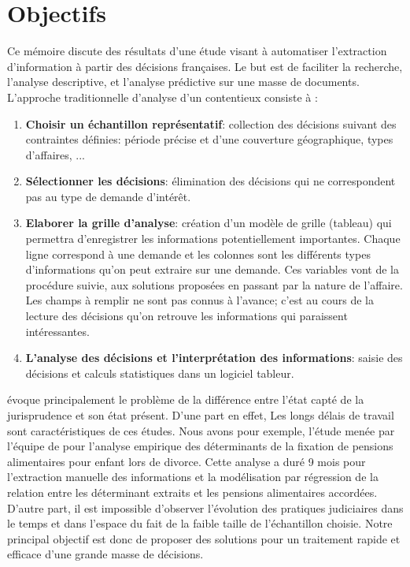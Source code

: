 \section{Objectifs}
 Ce mémoire discute des résultats d'une étude visant à automatiser l'extraction d'information à partir des décisions françaises. Le but est de faciliter la recherche, l'analyse descriptive, et l'analyse prédictive sur une masse de documents. L'approche traditionnelle d'analyse d'un contentieux \citep{ancel2003expulsion} consiste à :
 \begin{enumerate}
 	\item \textbf{Choisir un échantillon représentatif}: collection des décisions suivant des contraintes définies:  période précise et d'une couverture géographique, types d'affaires, ... 
 	\item \textbf{Sélectionner les décisions}: élimination des décisions qui ne correspondent pas au type de demande d'intérêt.
 	\item \textbf{Elaborer la grille d'analyse}: création d'un modèle de grille (tableau) qui permettra d'enregistrer les informations potentiellement importantes. Chaque ligne correspond à une demande et les colonnes sont les différents types d'informations qu'on peut extraire sur une demande. Ces variables vont de la procédure suivie, aux solutions proposées en passant par la nature de l'affaire. Les champs à remplir ne sont pas connus à l'avance; c'est au cours de la lecture des décisions qu'on retrouve les informations qui paraissent intéressantes.
 	\item \textbf{L'analyse des décisions et l'interprétation des informations}: saisie des décisions et calculs statistiques dans un logiciel tableur.
 \end{enumerate}
 
\citet{ancel2003expulsion} évoque principalement le problème de la différence entre l'état capté de la jurisprudence et son état présent. D'une part en effet, Les longs délais de travail sont caractéristiques de ces études. Nous avons pour exemple, l'étude menée  par l'équipe de \citet{jeandidier2006pensions} pour l'analyse empirique des déterminants de la fixation de pensions alimentaires pour enfant lors de divorce. Cette analyse a duré 9 mois pour l'extraction manuelle des informations et la modélisation par régression de la relation entre les déterminant extraits et les pensions alimentaires accordées.  D'autre part, il est impossible d'observer l'évolution des pratiques judiciaires dans le temps et dans l'espace du fait de la faible taille de l'échantillon choisie. Notre principal objectif est donc de proposer des solutions pour un traitement rapide et efficace d'une grande masse de décisions. 
 
